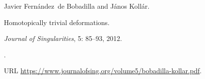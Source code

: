 Javier Fern\'andez~de Bobadilla and J\'anos Koll\'ar.

\newblock Homotopically trivial deformations.

\newblock \emph{Journal of Singularities}, 5: 85--93, 2012.

\newblock {}.

\newblock URL \url{https://www.journalofsing.org/volume5/bobadilla-kollar.pdf}.

